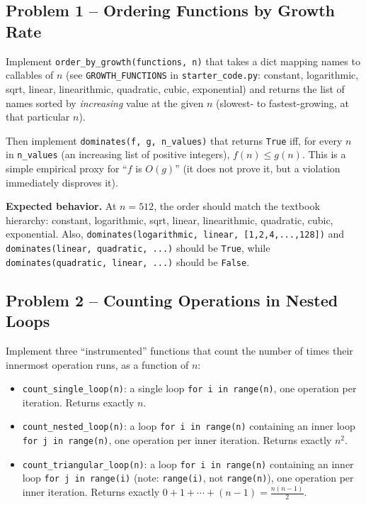 \documentclass[11pt]{article}
\begin{document}
\subsection*{Problem 1 -- Ordering Functions by Growth Rate}

Implement \texttt{order\_by\_growth(functions, n)} that takes a dict mapping names to
callables of $n$ (see \texttt{GROWTH\_FUNCTIONS} in \texttt{starter\_code.py}: constant,
logarithmic, sqrt, linear, linearithmic, quadratic, cubic, exponential) and returns the
list of names sorted by \emph{increasing} value at the given $n$ (slowest- to
fastest-growing, at that particular $n$).

Then implement \texttt{dominates(f, g, n\_values)} that returns \texttt{True} iff, for
every $n$ in \texttt{n\_values} (an increasing list of positive integers), $f(n) \le
g(n)$. This is a simple empirical proxy for ``$f$ is $O(g)$'' (it does not prove it, but a
violation immediately disproves it).

\textbf{Expected behavior.} At $n=512$, the order should match the textbook hierarchy:
constant, logarithmic, sqrt, linear, linearithmic, quadratic, cubic, exponential. Also,
\texttt{dominates(logarithmic, linear, [1,2,4,...,128])} and
\texttt{dominates(linear, quadratic, ...)} should be \texttt{True}, while
\texttt{dominates(quadratic, linear, ...)} should be \texttt{False}.

\subsection*{Problem 2 -- Counting Operations in Nested Loops}

Implement three ``instrumented'' functions that count the number of times their innermost
operation runs, as a function of $n$:
\begin{itemize}
    \item \texttt{count\_single\_loop(n)}: a single loop \texttt{for i in range(n)}, one
    operation per iteration. Returns exactly $n$.
    \item \texttt{count\_nested\_loop(n)}: a loop \texttt{for i in range(n)} containing an
    inner loop \texttt{for j in range(n)}, one operation per inner iteration. Returns
    exactly $n^2$.
    \item \texttt{count\_triangular\_loop(n)}: a loop \texttt{for i in range(n)} containing
    an inner loop \texttt{for j in range(i)} (note: \texttt{range(i)}, not
    \texttt{range(n)}), one operation per inner iteration. Returns exactly
    $0+1+\cdots+(n-1) = \frac{n(n-1)}{2}$.
\end{itemize}
\end{document}
